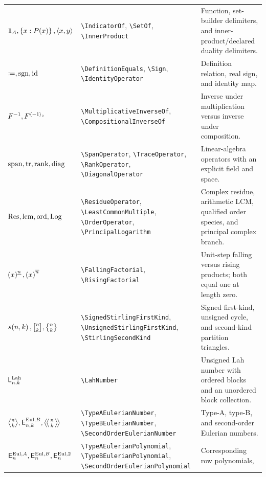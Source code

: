 \documentclass[11pt,oneside]{article}
\theoremstyle{definition}
\theoremstyle{remark}
\DeclareRobustCommand{\commandname}[1]{\texttt{\textbackslash#1}}
\begin{document}
\begin{longtable}{@{}L{0.22\textwidth}S{0.38\textwidth}L{0.34\textwidth}@{}}
$\mathbf{1}_{A},\left\{x:P(x)\right\},\left\langle x,y\right\rangle$ &
\commandname{IndicatorOf}, \commandname{SetOf}, \commandname{InnerProduct} & Function,
set-builder delimiters, and inner-product/declared duality delimiters.\\
$\mathrel{\coloneqq},\operatorname{sgn},\operatorname{id}$ & \commandname{DefinitionEquals},
\commandname{Sign}, \commandname{IdentityOperator} & Definition relation, real sign,
and identity map.\\
\(F^{-1},F^{\langle -1\rangle_{\circ}}\) &
\commandname{MultiplicativeInverseOf}, \commandname{CompositionalInverseOf} &
Inverse under multiplication versus inverse under composition.\\
$\operatorname{span},\operatorname{tr},\operatorname{rank},\operatorname{diag}$ &
\commandname{SpanOperator}, \commandname{TraceOperator}, \commandname{RankOperator},
\commandname{DiagonalOperator} & Linear-algebra operators with an explicit field and
space.\\
$\operatorname*{Res},\operatorname{lcm},\operatorname{ord},\operatorname{Log}$ &
\commandname{ResidueOperator}, \commandname{LeastCommonMultiple},
\commandname{OrderOperator}, \commandname{PrincipalLogarithm} & Complex residue,
arithmetic LCM, qualified order species, and principal complex branch.\\
$\left(x\right)^{\underline{n}},\left(x\right)^{\overline{n}}$ &
\commandname{FallingFactorial}, \commandname{RisingFactorial} & Unit-step falling versus
rising products; both equal one at length zero.\\
\(\SignedStirlingFirstKind{n}{k},
  \UnsignedStirlingFirstKind{n}{k},
  \StirlingSecondKind{n}{k}\) &
\commandname{SignedStirlingFirstKind},
\commandname{UnsignedStirlingFirstKind},
\commandname{StirlingSecondKind} & Signed first-kind, unsigned cycle, and
second-kind partition triangles.\\
\(\mathsf{L}^{\mathrm{Lah}}_{n,k}\) & \commandname{LahNumber} & Unsigned Lah number with
ordered blocks and an unordered block collection.\\
\(\TypeAEulerianNumber{n}{k},\TypeBEulerianNumber{n}{k},
  \SecondOrderEulerianNumber{n}{k}\) &
\commandname{TypeAEulerianNumber}, \commandname{TypeBEulerianNumber},
\commandname{SecondOrderEulerianNumber} & Type-A, type-B, and second-order
Eulerian numbers.\\
\(\mathsf{E}^{\mathrm{Eul},A}_{n},\mathsf{E}^{\mathrm{Eul},B}_{n},
  \mathsf{E}^{\mathrm{Eul},2}_{n}\) &
\commandname{TypeAEulerianPolynomial}, \commandname{TypeBEulerianPolynomial},
\commandname{SecondOrderEulerianPolynomial} & Corresponding row polynomials,

\end{longtable}
\end{document}
